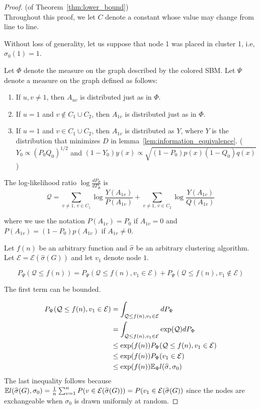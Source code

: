 \begin{proof}(of Theorem~\ref{thm:lower_bound})\\
Throughout this proof, we let $C$ denote a constant whose value may change from line to line. 

Without loss of generality, let us suppose that node 1 was placed in cluster 1, i.e, $\sigma_0(1) = 1$. 

Let $\Phi$ denote the measure on the graph described by the colored SBM. Let $\Psi$ denote a measure on the graph defined as follows:

\begin{enumerate}
\item If $u,v \neq 1$, then $A_{uv}$ is distributed just as in $\Phi$. 
\item If $u = 1$ and $v \notin C_1 \cup C_2$, then $A_{1v}$ is distributed just as in $\Phi$.
\item If $u = 1$ and $v \in C_1 \cup C_2$, then $A_{1v}$ is distributed as $Y$, where $Y$ is the distribution that minimizes $D$ in lemma~\ref{lem:information_equivalence}. ($Y_0 \propto (P_0 Q_0)^{1/2}$ and $(1-Y_0) y(x) \propto \sqrt{(1-P_0)p(x)(1-Q_0) q(x)}$)
\end{enumerate}

The log-likelihood ratio $\log \frac{d P_{\Psi} }{d P_{\Phi}}$ is 
\[
\mathcal{Q} = \sum_{v \neq 1,\, v \in C_1} \log \frac{Y(A_{1v})}{P(A_{1v})} + \sum_{v \neq 1,\, v \in C_2} \log \frac{Y(A_{1v})}{Q(A_{1v})} 
\]

where we use the notation $P(A_{1v}) = P_0$ if $A_{1v} = 0$ and $P(A_{1v}) = (1-P_0)p(A_{1v})$ if $A_{1v} \neq 0$.

Let $f(n)$ be an arbitrary function and $\hat{\sigma}$ be an arbitrary clustering algorithm. Let $\mathcal{E} = \mathcal{E}(\hat{\sigma}(G))$ and let $v_1$ denote node $1$. 

\[
P_{\Psi}( \mathcal{Q} \leq f(n) ) = P_{\Psi}( \mathcal{Q} \leq f(n), v_1 \in \mathcal{E}) +
 P_{\Psi}( \mathcal{Q} \leq f(n), v_1 \notin \mathcal{E} )
\]

The first term can be bounded.

\begin{align*}
P_{\Psi}( \mathcal{Q} \leq f(n), v_1 \in \mathcal{E}) &= \int_{\mathcal{Q} \leq f(n), v_1 \in \mathcal{E}} d P_{\Psi} \\
    &= \int_{\mathcal{Q} \leq f(n), v_1 \in \mathcal{E}} \exp(\mathcal{Q}) d P_{\Phi} \\
    &\leq \exp(f(n)) P_{\Phi}( \mathcal{Q} \leq f(n), v_1 \in \mathcal{E}) \\
    &\leq \exp(f(n)) P_{\Phi}(v_1 \in \mathcal{E}) \\
    &\leq \exp(f(n)) {\mathbb E}_{\Phi}  l(\widehat{\sigma}, \sigma_0)
\end{align*}
The last inequality follows because  ${\mathbb E} l(\widehat{\sigma}(G), \sigma_0) = \frac{1}{n} \sum_{v=1}^n P( v \in \mathcal{E}(\widehat{\sigma}(G)) ) = P(v_1 \in \mathcal{E}(\widehat{\sigma}(G))$ since the nodes are exchangeable when $\sigma_0$ is drawn uniformly at random. 



\end{proof}
